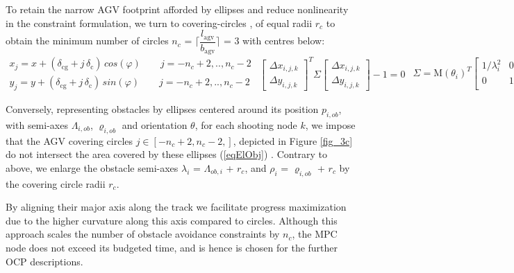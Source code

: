 To retain the narrow \ac{AGV} footprint afforded by ellipses and reduce nonlinearity in the constraint formulation, we turn to covering-circles \cite{khorkov_optimization_2021}, \cite{heppes_covering_1997} of equal radii  $r_{c}$ to obtain the minimum number of circles $n_{c}$ = $\lceil \dfrac{l_{\mathrm{agv}}}{b_{\mathrm{agv}}} \rceil$ = 3 with centres below:
\begin{subequations}
\begin{align}
    x_{j} = x + (\delta_{\mathrm{cg}} + j\, \delta_{\mathrm{c}})\, cos(\varphi)\qquad j = -n_{c} + 2,..,n_{c} - 2\\
    y_{j} = y + (\delta_{\mathrm{cg}} + j\, \delta_{\mathrm{c}})\, sin(\varphi)\qquad j = -n_{c} + 2,..,n_{c} -2
\end{align}
\begin{align}
    \begin{bmatrix}
        \Delta x_{i, j, k}\\
        \Delta y_{i, j, k}
    \end{bmatrix}^T
    \Sigma
    \begin{bmatrix}
        \Delta x_{i, j, k}\\
        \Delta y_{i, j, k}
    \end{bmatrix} - 1 = 0 \label{eqElObj}
\end{align}
\begin{align}\Sigma =
\mathrm{M}(\theta_{i})^T
    \begin{bmatrix}
        1/\lambda^{2}_{i} & 0\\
        0 & 1/\rho^{2}_{i}
    \end{bmatrix}
    \mathrm{M}(\theta_{i})
\end{align}    
\end{subequations}

Conversely, representing obstacles by ellipses centered around its position $p_{i, ob}$, with semi-axes $\Lambda_{i, ob}$, $\varrho_{i, ob}$ and orientation $\theta$, for each shooting node $k$, we impose that the AGV covering circles $j \in [-n_{c} + 2, n_{c} - 2,]$, depicted in Figure \ref{fig_3c} do not intersect the area covered by these ellipses (\ref{eqElObj}) \cite{brito_model_2020}. Contrary to above, we enlarge the obstacle semi-axes $\lambda_{i}$ = $\Lambda_{ob, i}$ + $r_{c}$, and $\rho_{i}$ = $\varrho_{i, ob}$ + $r_{c}$ by the covering circle radii $r_{c}$.
\par By aligning their major axis along the track we facilitate progress maximization due to the higher curvature along this axis compared to circles. Although this approach scales the number of obstacle avoidance constraints by $n_{c}$, the \ac{MPC} node does not exceed its budgeted time, and is hence is chosen for the further \ac{OCP} descriptions. 

